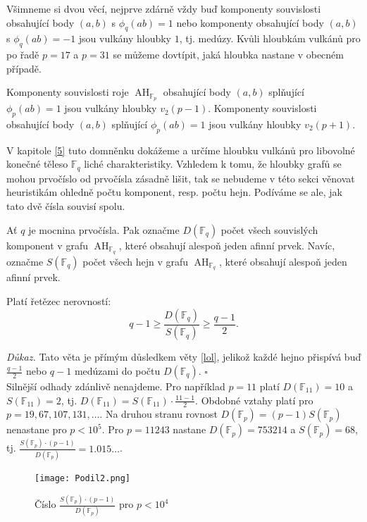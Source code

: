 \documentclass[12pt]{report}
\DeclareMathOperator{\AH}{AH}
\begin{document}
Všimneme si dvou věcí, nejprve zdárně vždy buď komponenty souvislosti obsahující body $(a,b)$ s $\phi_q(ab)=1$ nebo komponenty obsahující body $(a,b)$ s $\phi_q(ab)=-1$ jsou vulkány hloubky $1$, tj. medúzy. Kvůli hloubkám vulkánů pro po řadě $p=17$ a $p=31$  se můžeme dovtípit, jaká hloubka nastane v obecném případě.

\begin{domnenka}
Komponenty souvislosti roje $\AH_{\mathbb{F}_p}$ obsahující body $(a,b)$ splňující $\phi_p(ab)=1$ jsou vulkány hloubky $v_2(p-1)$. Komponenty souvislosti obsahující body $(a,b)$ splňující $\phi_p(ab)=1$ jsou vulkány hloubky $v_2(p+1)$.
\end{domnenka}

V kapitole \ref{5} tuto domněnku dokážeme a určíme hloubku vulkánů pro libovolné konečné těleso $\mathbb{F}_q$ liché charakteristiky. Vzhledem k tomu, že hloubky grafů se mohou prvočíslo od prvočísla zásadně lišit, tak se nebudeme v této sekci věnovat heuristikám ohledně počtu komponent, resp. počtu hejn. Podíváme se ale, jak tato dvě čísla souvisí spolu.

\begin{definice}
Ať $q$ je mocnina prvočísla. Pak označme $D(\mathbb{F}_q)$ počet všech souvislých komponent v grafu $\AH_{\mathbb{F}_q}$, které obsahují alespoň jeden afinní prvek. Navíc, označme $S(\mathbb{F}_q)$ počet všech hejn v grafu $\AH_{\mathbb{F}_q}$, které obsahují alespoň jeden afinní prvek.
\end{definice}


\begin{veta}\label{po}
Platí řetězec nerovností:
$$q-1 \geqslant \frac{D(\mathbb{F}_q)}{S(\mathbb{F}_q)} \geqslant \frac{q-1}{2}.$$
\end{veta}
\noindent \textit{Důkaz.} Tato věta je přímým důsledkem věty \ref{lol}, jelikož každé hejno přispívá buď $\frac{q-1}{2}$ nebo $q-1$ medúzami do počtu $D(\mathbb{F}_q)$. \hfill $\square$\\

Silnější odhady zdánlivě nenajdeme. Pro například $p = 11$ platí $D(\mathbb{F}_{11}) = 10$ a $S(\mathbb{F}_{11}) = 2$, tj. $D(\mathbb{F}_{11}) = S(\mathbb{F}_{11}) \cdot \frac{11-1}{2}$. Obdobné vztahy platí pro $p = 19, 67,107,131,\dots$. Na druhou stranu rovnost $D(\mathbb{F}_p) = (p-1) S(\mathbb{F}_p)$ nenastane pro $p<10^5$. Pro $p =11243$ nastane $D(\mathbb{F}_p) = 753214$ a $S(\mathbb{F}_p) = 68$, tj. $\frac{S(\mathbb{F}_p) \cdot (p-1)}{D(\mathbb{F}_p)} = 1.015\dots$. 
\begin{figure}[h]
\centering
  \texttt{[image: Podil2.png]}
  \label{fig:boat1}
  \caption{Číslo $\frac{S(\mathbb{F}_p) \cdot (p-1)}{D(\mathbb{F}_p)}$ pro $p < 10^4$}
\end{figure}
\end{document}
